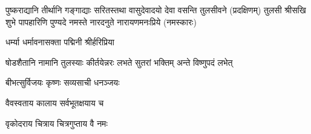 \twolineshloka
{पुष्कराद्यानि तीर्थानि गङ्गाद्याः सरितस्तथा}
{वासुदेवादयो देवा वसन्ति तुलसीवने}
(प्रदक्षिणम्)
\twolineshloka
{तुलसी श्रीसखि शुभे पापहारिणि पुण्यदे}
{नमस्ते नारदनुते नारायणमनःप्रिये}
(नमस्कारः)



{धर्म्या धर्मावनासक्ता पद्मिनी श्रीर्हरिप्रिया}

{षोडशैतानि नामानि तुलस्याः कीर्तयेन्नरः}
{लभते सुतरां भक्तिम् अन्ते विष्णुपदं लभेत्}

\closesub


{बीभत्सुर्विजयः कृष्णः सव्यसाची धनञ्जयः}

\closesub


{वैवस्वताय   कालाय   सर्वभूतक्षयाय   च}

{वृकोदराय   चित्राय   चित्रगुप्ताय   वै  नमः}

\closesub
